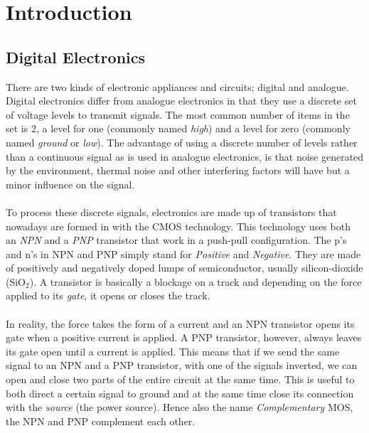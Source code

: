 \documentclass[11pt,british]{article}
\begin{document}
\newpage{}


\section{Introduction}
\label{sec:intro}

\subsection{Digital Electronics}

There are two kinds of electronic appliances and circuits; digital and analogue. Digital electronics differ from analogue electronics in that they use a discrete set of voltage levels to transmit signals. The most common number of items in the set is 2, a level for one (commonly
named \emph{high}) and a level for zero (commonly named \emph{ground} or \emph{low}). The advantage of using a discrete number of levels rather than a continuous signal as is used in analogue electronics, is that noise generated by the environment, thermal noise and other interfering factors will have but a minor influence on the signal.
\\
\\
To process these discrete signals, electronics are made up of transistors that nowadays are formed in with the \gls{CMOS} technology. This technology uses both an \emph{NPN} and a \emph{PNP} transistor that work in a push-pull configuration. The p's and n's in NPN and PNP simply stand for \emph{Positive} and \emph{Negative}. They are made of positively and negatively doped lumps of semiconductor, usually silicon-dioxide (SiO$_{2}$). A transistor is basically a blockage on a track and depending on the force applied to its \emph{gate}, it opens or closes the track.
\\
\\
In reality, the force takes the form of a current and an NPN transistor opens its gate when a positive current is applied. A PNP transistor, however, always leaves its gate open until a current is applied. This means that if we send the same signal to an NPN and a PNP transistor, with one of the signals inverted, we can open and close two parts of the entire circuit at the same time. This is useful to both direct a certain signal to ground and at the same time close its connection with the \emph{source} (the power source). Hence also the name \emph{Complementary} MOS, the NPN and PNP complement each other.
\\
\end{document}
